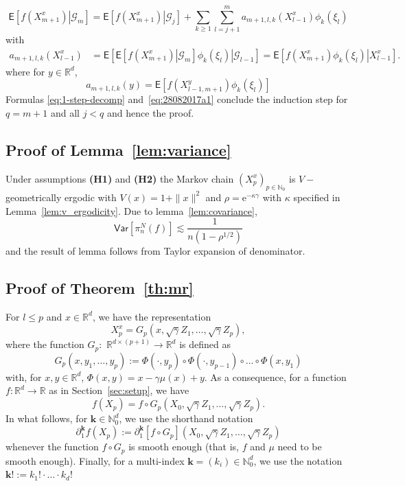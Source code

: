 \documentclass[bj]{imsart}
\def\PVar{\mathsf{Var}}
\def\nset{\mathbb{N}}
\def\rset{\mathbb{R}}
\def\rme{\mathrm{e}}
\def\rset{\mathbb{R}}
\begin{document}
\begin{equation}\label{eq:28082017a1}
\mathsf{E}\left[\left.f(X^x_{m+1})\right| \mathcal{G}_m \right]=\mathsf{E}\left[\left.f(X^x_{m+1})\right| \mathcal{G}_j \right]+\sum_{k\geq1}\sum_{l=j+1}^{m}a_{m+1,l,k}(X^x_{l-1})\phi_{k}(\xi_{l})
\end{equation}
with
\begin{align*}
a_{m+1,l,k}(X^x_{l-1}) &= \mathsf{E}\left[\left.\mathsf{E}\left[\left.f(X^x_{m+1})\right|\mathcal{G}_{m}\right]\phi_{k}(\xi_{l})\right|\mathcal{G}_{l-1}\right]
 = \mathsf{E}\left[\left.f(X^x_{m+1})\phi_{k}(\xi_{l})\right|X^x_{l-1}\right].
\end{align*}
where for $y \in \rset^d$,
\[
a_{m+1,l,k}(y) = \mathsf{E}\left[f(X^y_{l-1,m+1})\phi_{k}(\xi_{l})\right]
\]
Formulas \eqref{eq:1-step-decomp}
and~\eqref{eq:28082017a1} conclude the induction step for $q = m+1$ and all $j < q$ and hence the proof.

\subsection{Proof of Lemma~\ref{lem:variance}}
Under assumptions {\bf (H1)} and {\bf (H2)} the Markov chain $(X^x_{p})_{p \in \nset_0}$ is $V-$geometrically ergodic with $V(x) = 1+\|x\|^2$ and $\rho = \rme^{-\kappa\gamma}$ with $\kappa$ specified in Lemma~\ref{lem:v_ergodicity}. Due to lemma~\ref{lem:covariance}, 
\[
\PVar[\pi_n^N(f)]\lesssim \frac{1}{n(1-\rho^{1/2})}
\]
and the result of lemma follows from Taylor expansion of denominator.



\subsection{Proof of Theorem~\ref{th:mr}}
For $l\le p$ and $x \in \rset^d$, we have the representation
\[
X^x_{p}=G_{p}(x,\sqrt{\gamma}Z_{1},\ldots,\sqrt{\gamma}Z_{p}),
\]
where the function \(G_{p}:\) \(\mathbb{R}^{d\times(p+1)}\to \mathbb{R}^{d}\) is defined as
\begin{equation}
\label{eq:definition-G-p-l}
G_{p}(x,y_1,\ldots,y_p):=\Phi(\cdot,y_{p})\circ\Phi(\cdot,y_{p-1})\circ\ldots\circ\Phi(x,y_{1})
\end{equation}
with, for $x,y\in\mathbb R^d$,   $\Phi(x,y)=x-\gamma\mu(x)+y$.
As a consequence, for a function $f\colon\mathbb R^d\to\mathbb R$
as in Section~\ref{sec:setup}, we have
$$
f\left(X_{p}\right) =f\circ G_{p}(X_{0},\sqrt{\gamma}Z_{1},\ldots,\sqrt{\gamma}Z_{p}).
$$
In what follows, for $\mathbf{k}\in\mathbb N_0^d$,
we use the shorthand notation
\begin{equation}
\label{eq:definition-differential-f-p}
\partial_{1}^{\mathbf k} f\left(X_{p}\right)
:=\partial_{1}^{\mathbf k} [f\circ G_{p}](X_{0},\sqrt{\gamma}Z_{1},\ldots,\sqrt{\gamma}Z_{p})
\end{equation}
whenever the function $f\circ G_{p}$ is smooth enough
(that is, $f$ and $\mu$ need to be smooth enough).
Finally, for a multi-index $\mathbf{k}=(k_i)\in\mathbb N_0^d$, we use the notation
\(\mathbf{k} ! :=k_1!\cdot\ldots\cdot k_d !\)
\end{document}

